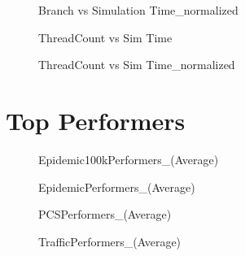 \vspace{1cm}
\begin{figure}[H]
\centering

\caption{Branch vs Simulation Time\_normalized}
\end{figure}
\vspace{1cm}
\newpage
\begin{figure}[H]
\centering

\caption{ThreadCount vs Sim Time}
\end{figure}
\vspace{1cm}
\begin{figure}[H]
\centering

\caption{ThreadCount vs Sim Time\_normalized}
\end{figure}
\vspace{1cm}
\newpage

\section{Top Performers}
\begin{figure}[H]
\centering

\caption{Epidemic100kPerformers\_(Average)}
\end{figure}
\vspace{1cm}
\begin{figure}[H]
\centering

\caption{EpidemicPerformers\_(Average)}
\end{figure}
\vspace{1cm}
\newpage
\begin{figure}[H]
\centering

\caption{PCSPerformers\_(Average)}
\end{figure}
\vspace{1cm}
\begin{figure}[H]
\centering

\caption{TrafficPerformers\_(Average)}
\end{figure}
\vspace{1cm}
\newpage

